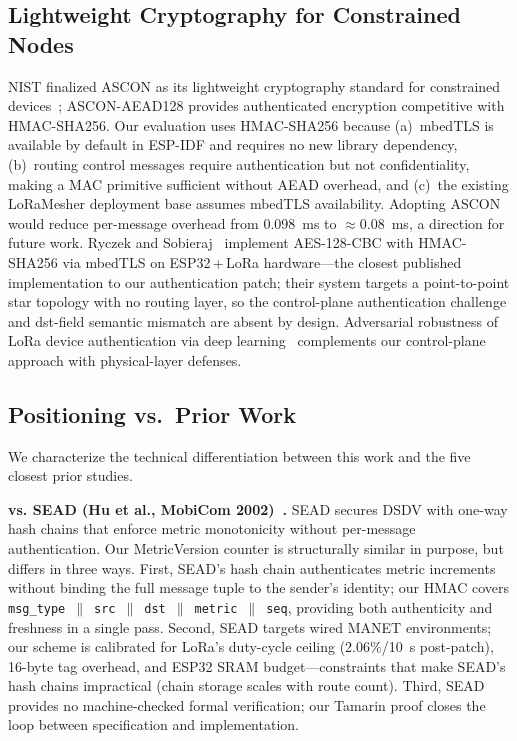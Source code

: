 \documentclass[preprint,12pt]{elsarticle}
\begin{document}
\subsection{Lightweight Cryptography for Constrained Nodes}

NIST finalized ASCON as its lightweight cryptography standard for
constrained devices~\cite{nist2025-sp800-232}; ASCON-AEAD128 provides
authenticated encryption competitive with HMAC-SHA256.
Our evaluation uses HMAC-SHA256 because (a)~mbedTLS is available by default in ESP-IDF and requires no new library dependency, (b)~routing control messages require authentication but not confidentiality, making a MAC primitive sufficient without AEAD overhead, and (c)~the existing LoRaMesher deployment base assumes mbedTLS availability.
Adopting ASCON would reduce per-message
overhead from 0.098~ms to $\approx$0.08~ms, a direction for
future work.
Ryczek and Sobieraj~\cite{ryczek2025-secure-lora-hmac} implement
AES-128-CBC with HMAC-SHA256 via mbedTLS on ESP32\,+\,LoRa
hardware—the closest published implementation to our authentication
patch; their system targets a point-to-point star topology with no
routing layer, so the control-plane authentication challenge and
dst-field semantic mismatch are absent by design.
Adversarial robustness of LoRa device
authentication via deep learning~\cite{ieee2025-lora-adversarial}
complements our control-plane approach with physical-layer defenses.

\subsection{Positioning vs.\ Prior Work}
\label{sec:positioning}

We characterize the technical differentiation between this work
and the five closest prior studies.

\textbf{vs. SEAD (Hu et al., MobiCom 2002)~\cite{hu2002-sead}.}
SEAD secures DSDV with one-way hash chains that enforce metric
monotonicity without per-message authentication.
Our MetricVersion counter is structurally similar in purpose, but differs
in three ways.
First, SEAD's hash chain authenticates metric increments without binding
the full message tuple to the sender's identity; our HMAC covers
\texttt{msg\_type}~$\|$~\texttt{src}~$\|$~\texttt{dst}~$\|$~\texttt{metric}~$\|$~\texttt{seq},
providing both authenticity and freshness in a single pass.
Second, SEAD targets wired MANET environments; our scheme is calibrated
for LoRa's duty-cycle ceiling (2.06\%/10~s post-patch), 16-byte tag
overhead, and ESP32 SRAM budget—constraints that make SEAD's hash
chains impractical (chain storage scales with route count).
Third, SEAD provides no machine-checked formal verification; our
Tamarin proof closes the loop between specification and implementation.
\end{document}
